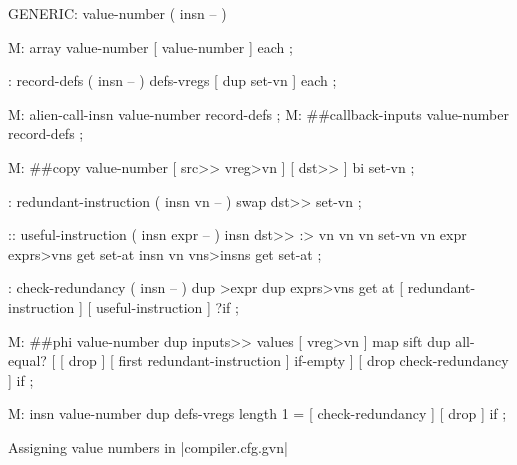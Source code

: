 \centering

  \begin{factorcode}
    GENERIC: value-number ( insn -- )

    M: array value-number [ value-number ] each ;

    : record-defs ( insn -- ) defs-vregs [ dup set-vn ] each ;

    M: alien-call-insn value-number record-defs ;
    M: ##callback-inputs value-number record-defs ;

    M: ##copy value-number [ src>> vreg>vn ] [ dst>> ] bi set-vn ;

    : redundant-instruction ( insn vn -- )
        swap dst>> set-vn ;

    :: useful-instruction ( insn expr -- )
        insn dst>> :> vn
        vn vn set-vn
        vn expr exprs>vns get set-at
        insn vn vns>insns get set-at ;

    : check-redundancy ( insn -- )
        dup >expr dup exprs>vns get at
        [ redundant-instruction ] [ useful-instruction ] ?if ;

    M: ##phi value-number
        dup inputs>> values [ vreg>vn ] map sift
        dup all-equal? [
            [ drop ] [ first redundant-instruction ] if-empty
        ] [ drop check-redundancy ] if ;

    M: insn value-number
        dup defs-vregs length 1 = [ check-redundancy ] [ drop ] if ;
  \end{factorcode}

\caption{Assigning value numbers in \factor|compiler.cfg.gvn|}
